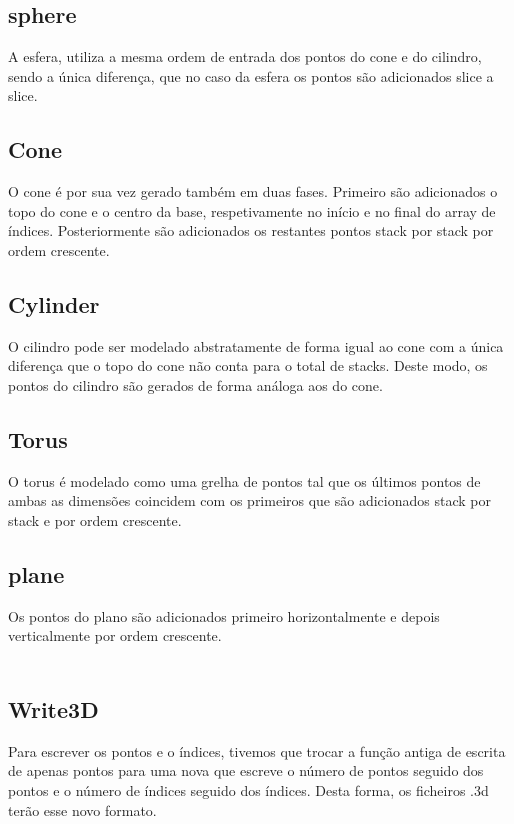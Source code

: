 \documentclass[14pt, a4 paper]{report}
\begin{document}
\subsection{sphere}
A esfera, utiliza a mesma ordem de entrada dos pontos do cone e do cilindro, sendo a única diferença, que no caso da esfera os pontos são adicionados slice a slice.

\subsection{Cone}
O cone é por sua vez gerado também em duas fases.
Primeiro são adicionados o topo do cone e o centro da base, respetivamente no início e no final do array de índices. Posteriormente são adicionados os restantes pontos stack por stack por ordem crescente.

\subsection{Cylinder}
O cilindro pode ser modelado abstratamente de forma igual ao cone com a única diferença que o topo do cone não conta para o total de stacks. Deste modo, os pontos do cilindro são gerados de forma análoga aos do cone.

\subsection{Torus}
O torus é modelado como uma grelha de pontos tal que os últimos pontos de ambas as dimensões coincidem com os primeiros que são adicionados stack por stack e por ordem crescente.

\subsection{plane}
Os pontos do plano são adicionados primeiro horizontalmente e depois verticalmente por ordem crescente. 
\\
\\

\subsection{Write3D}
Para escrever os pontos e o índices, tivemos que trocar a função antiga de escrita de apenas pontos para uma nova que escreve o número de pontos seguido dos pontos e o número de índices seguido dos índices. Desta forma, os ficheiros .3d terão esse novo formato.
\end{document}
